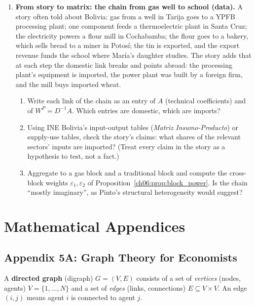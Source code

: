 \documentclass[../structural_economics_book.tex]{subfiles}
\begin{document}
\begin{enumerate}[label=\textbf{5.\arabic*}, leftmargin=3em]
\item \textbf{From story to matrix: the chain from gas well to school (data).} A story often told about Bolivia: gas from a well in Tarija goes to a YPFB processing plant; one component feeds a thermoelectric plant in Santa Cruz; the electricity powers a flour mill in Cochabamba; the flour goes to a bakery, which sells bread to a miner in Potos\'{i}; the tin is exported, and the export revenue funds the school where Mar\'{i}a's daughter studies. The story adds that at each step the domestic link breaks and points abroad: the processing plant's equipment is imported, the power plant was built by a foreign firm, and the mill buys imported wheat.
\begin{enumerate}
\item Write each link of the chain as an entry of $A$ (technical coefficients) and of $W^P = D^{-1}A$. Which entries are domestic, which are imports?
\item Using INE Bolivia's input-output tables (\textit{Matriz Insumo-Producto}) or supply-use tables, check the story's claims: what shares of the relevant sectors' inputs are imported? (Treat every claim in the story as a hypothesis to test, not a fact.)
\item Aggregate to a gas block and a traditional block and compute the cross-block weights $\varepsilon_1, \varepsilon_2$ of Proposition~\ref{ch06:prop:block_power}. Is the chain ``mostly imaginary'', as Pinto's structural heterogeneity would suggest?
\end{enumerate}

\end{enumerate}


\newpage
\section*{Mathematical Appendices}

\subsection*{Appendix 5A: Graph Theory for Economists}
\label{ch05:app:graphs}

A \textbf{directed graph} (digraph) $G = (V, E)$ consists of a set of \textit{vertices} (nodes, agents) $V = \{1, \ldots, N\}$ and a set of \textit{edges} (links, connections) $E \subseteq V \times V$. An edge $(i, j)$ means agent $i$ is connected to agent $j$.
\end{document}
